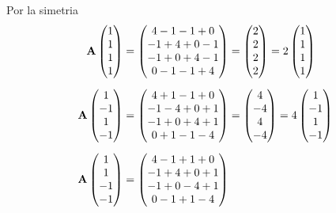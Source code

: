 Por la simetria
\begin{align*}
	\mat{A}\begin{pmatrix} 1\\ 1\\ 1\\ 1 \end{pmatrix}
	&= \begin{pmatrix} 4 - 1 - 1 + 0\\ -1 + 4 + 0 - 1\\ -1 + 0 + 4 - 1\\ 0 - 1 - 1 + 4 \end{pmatrix}
	= \begin{pmatrix} 2\\ 2\\ 2\\ 2 \end{pmatrix} = 2\begin{pmatrix} 1\\ 1\\ 1\\ 1 \end{pmatrix}\\[6pt]
	\mat{A}\begin{pmatrix} 1\\ -1\\ 1\\ -1 \end{pmatrix}
	&= \begin{pmatrix} 4 + 1 - 1 + 0\\ -1 - 4 + 0 + 1\\ -1 + 0 + 4 + 1\\ 0 + 1 - 1 - 4 \end{pmatrix}
	= \begin{pmatrix} 4\\ -4\\ 4\\ -4 \end{pmatrix} = 4\begin{pmatrix} 1\\ -1\\ 1\\ -1 \end{pmatrix}\\[6pt]
	\mat{A}\begin{pmatrix} 1\\ 1\\ -1\\ -1 \end{pmatrix}
	&= \begin{pmatrix} 4 - 1 + 1 + 0\\ -1 + 4 + 0 + 1\\ -1 + 0 - 4 + 1\\ 0 - 1 + 1 - 4 \end{pmatrix}

\end{align*}
